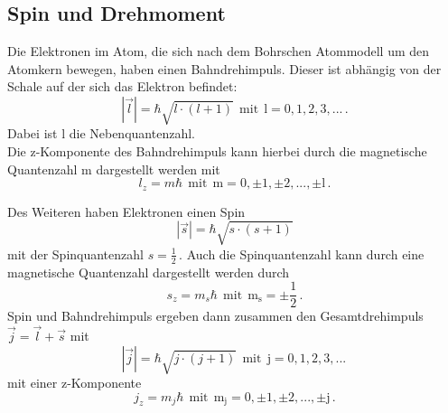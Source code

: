 \documentclass{scrartcl}
\begin{document}
\subsection{Spin und Drehmoment}
Die Elektronen im Atom, die sich nach dem Bohrschen Atommodell um den Atomkern bewegen, haben einen Bahndrehimpuls. Dieser ist abhängig von der Schale auf der sich das Elektron befindet:
\begin{equation}
    |\Vec{l}| = \hbar \sqrt{l\cdot(l+1)} \ \ \mathrm{mit} \ \ \mathrm{l=0,1,2,3,...} \,.
\end{equation}
Dabei ist l die Nebenquantenzahl. \\
Die z-Komponente des Bahndrehimpuls kann hierbei durch die magnetische Quantenzahl m dargestellt werden mit
\begin{equation}
    l_{z}=m\hbar  \ \ \mathrm{mit} \ \ \mathrm{m=0,\pm 1,\pm 2,..., \pm l} \,.
\end{equation}

Des Weiteren haben Elektronen einen Spin 
\begin{equation}
     |\Vec{s}| = \hbar \sqrt{s\cdot(s+1)} 
\end{equation}
mit der Spinquantenzahl $s=\frac{1}{2}\,.$
Auch die Spinquantenzahl kann durch eine magnetische Quantenzahl dargestellt werden durch
\begin{equation}
\label{sz}
    s_{z}=m_{s}\hbar  \ \ \mathrm{mit} \ \ \mathrm{m_{s}=\pm \frac{1}{2}} \,.
\end{equation}
Spin und Bahndrehimpuls ergeben dann zusammen den Gesamtdrehimpuls $\Vec{j}=\Vec{l}+\Vec{s}$ mit 
\begin{equation}
    |\Vec{j}|=\hbar\sqrt{j\cdot(j+1)}\ \ \mathrm{mit} \ \ \mathrm{j=0,1,2,3,...} \,
\end{equation}
mit einer z-Komponente
\begin{equation}
    j_{z}=m_{j}\hbar \ \ \mathrm{mit} \ \ \mathrm{m_{j}=0,\pm 1,\pm 2, ..., \pm j} \,.
\end{equation}
\end{document}
